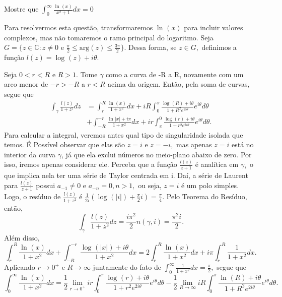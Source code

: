 \documentclass[complex.tex]{subfiles}
\begin{document}
\begin{exer*}
	Mostre que \(\int_{0}^{\infty}\frac{\ln^{}{(x)}}{x^{2}+1}dx = 0\)

	Para resolvermos esta questão, transformaremos \(\ln^{}{(x)}\) para incluir valores complexos, mas não tomaremos o ramo principal do logaritmo.
	Seja \(G = \{z\in \mathbb{C}: z\neq0\text{ e }\frac{\pi }{2}\leq \mathrm{arg}(z)\leq \frac{3\pi }{2}\}.\) Dessa forma, se \(z\in G,\) definimos a função
	\(l(z) = \log^{}{(z)} + i\theta .\)

	Seja \(0 < r < R\) e \(R > 1\). Tome \(\gamma \) como a curva de -R a R, novamente com um arco menor de \(-r > -R\) a \(r < R\) acima da origem. Então,
	pela soma de curvas, segue que
	\begin{align*}
		\int_{\gamma }^{}\frac{l(z)}{1 + z^{2}}dz & = \int_{r}^{R}\frac{\ln^{}{(x)}}{1 + x^{2}}dx + iR \int_{0}^{\pi }\frac{\log^{}{(R)}+i\theta }{1 + R^{2}e^{2i\theta }}e^{i\theta }d\theta            \\
		                                          & + \int_{-R}^{-r}\frac{\ln^{}{|x|}+i\pi }{1 + x^{2}}dx + ir \int_{\pi }^{0}\frac{\log^{}{(r)} + i\theta }{1 + r^{2}e^{2i\theta }}e^{i\theta }d\theta.
	\end{align*}
	Para calcular a integral, veremos antes qual tipo de singularidade isolada que temos. É Possível observar que elas são
	\(z=i\) e \(z=-i,\) mas apenas \(z=i\) está no interior da curva \(\gamma \), já que ela exclui números no meio-plano abaixo de zero. Por isso,
	iremos apenas considerar ele. Perceba que a função \(\frac{l(z)}{z+1}\) é analítica em \(\gamma ,\) o que implica nela ter uma série de Taylor
	centrada em i. Daí, a série de Laurent para \(\frac{l(z)}{z+1}\) possui \(a_{-1}\neq0\) e \(a_{-n} = 0, n > 1,\) ou seja,
	\(z=i\) é um polo simples. Logo, o resíduo de \(\frac{l(z)}{1+z^{2}}\) é \(\frac{1}{2i}(\log^{}{(|i|)} + \frac{\pi }{2}i) = \frac{\pi }{4}.\)
	Pelo Teorema do Resíduo, então,
	\[
		\int_{\gamma }^{}\frac{l(z)}{1+z^{2}}dz = \frac{i\pi ^{2}}{2}n(\gamma, i) = \frac{\pi^{2}i}{2}.
	\]
	Além disso,
	\[
		\int_{r}^{R}\frac{\ln^{}{(x)}}{1+x^{2}}dx + \int_{-R}^{-r}\frac{\log^{}{(|x|)} + i\theta }{1 + x^{2}}dx = 2 \int_{r}^{R}\frac{\ln^{}{(x)}}{1 + x^{2}}dx + i\pi \int_{r}^{R}\frac{1}{1+x^{2}}dx.
	\]
	Aplicando \(r\to 0^{+}\) e \(R\to \infty\) juntamente do fato de \(\int_{0}^{\infty}\frac{1}{1+x^{2}}dx = \frac{\pi }{2},\) segue que
	\[
		\int_{0}^{\infty}\frac{\ln^{}{(x)}}{1 + x^{2}}dx = \frac{1}{2}\lim_{r\to 0^{+}}ir \int_{0}^{\pi }\frac{\log^{}{(r)} + i\theta }{1 + r^{2}e^{2i\theta }}e^{i\theta }d\theta - \frac{1}{2}\lim_{R\to \infty}iR \int_{0}^{\pi }\frac{\ln^{}{(R)} + i\theta }{1 + R^{2}e^{2i\theta }}e^{i\theta }d\theta .
\]
\end{exer*}
\end{document}
